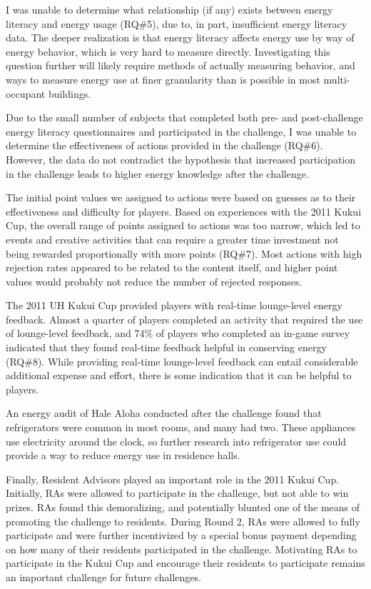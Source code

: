 I was unable to determine what relationship (if any) exists between energy literacy and energy usage (RQ\#5), due to, in part, insufficient energy literacy data. The deeper realization is that energy literacy affects energy use by way of energy behavior, which is very hard to measure directly. Investigating this question further will likely require methods of actually measuring behavior, and ways to measure energy use at finer granularity than is possible in most multi-occupant buildings.

Due to the small number of subjects that completed both pre- and post-challenge energy literacy questionnaires and participated in the challenge, I was unable to determine the effectiveness of actions provided in the challenge (RQ\#6). However, the data do not contradict the hypothesis that increased participation in the challenge leads to higher energy knowledge after the challenge.

The initial point values we assigned to actions were based on guesses as to their effectiveness and difficulty for players. Based on experiences with the 2011 Kukui Cup, the overall range of points assigned to actions was too narrow, which led to events and creative activities that can require a greater time investment not being rewarded proportionally with more points (RQ\#7). Most actions with high rejection rates appeared to be related to the content itself, and higher point values would probably not reduce the number of rejected responses.

The 2011 UH Kukui Cup provided players with real-time lounge-level energy feedback. Almost a quarter of players completed an activity that required the use of lounge-level feedback, and 74\% of players who completed an in-game survey indicated that they found real-time feedback helpful in conserving energy (RQ\#8). While providing real-time lounge-level feedback can entail considerable additional expense and effort, there is some indication that it can be helpful to players. 

An energy audit of Hale Aloha conducted after the challenge found that refrigerators were common in most rooms, and many had two. These appliances use electricity around the clock, so further research into refrigerator use could provide a way to reduce energy use in residence halls.

Finally, Resident Advisors played an important role in the 2011 Kukui Cup. Initially, RAs were allowed to participate in the challenge, but not able to win prizes. RAs found this demoralizing, and potentially blunted one of the means of promoting the challenge to residents. During Round 2, RAs were allowed to fully participate and were further incentivized by a special bonus payment depending on how many of their residents participated in the challenge. Motivating RAs to participate in the Kukui Cup and encourage their residents to participate remains an important challenge for future challenges.
